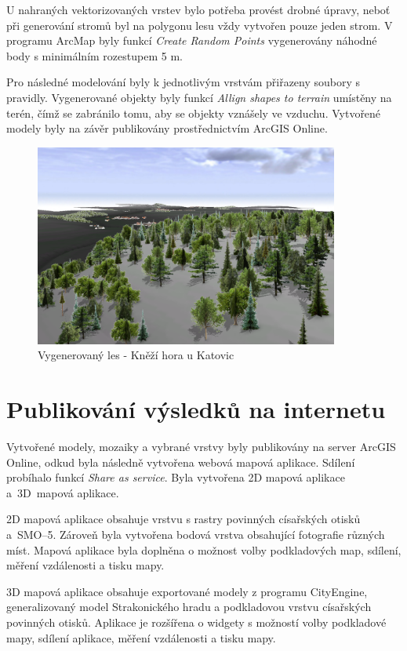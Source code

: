 \documentclass[thesis=M,czech]{FITthesis}[2012/06/26]
\begin{document}
U nahraných vektorizovaných vrstev bylo potřeba provést drobné úpravy, neboť při generování stromů byl na polygonu lesu vždy vytvořen pouze jeden strom. V programu ArcMap byly funkcí \textit{Create Random Points} vygenerovány náhodné body s minimálním rozestupem 5 m. 

Pro následné modelování byly k jednotlivým vrstvám přiřazeny soubory s pravidly. Vygenerované objekty byly funkcí \textit{Allign shapes to terrain} umístěny na terén, čímž se zabránilo tomu, aby se objekty vznášely ve vzduchu. Vytvořené modely byly na závěr publikovány prostřednictvím ArcGIS Online.

\begin{figure}[h]
	\centering
	\includegraphics[width=10cm]{pics/lesy_knezihora.png}
	\caption{Vygenerovaný les - Kněží hora u Katovic}
	\label{obrazek:knezihora}
\end{figure}


\section{Publikování výsledků na internetu}
Vytvořené modely, mozaiky a vybrané vrstvy byly publikovány na server Arc\-GIS Online, odkud byla následně vytvořena webová mapová aplikace. Sdílení probíhalo funkcí \textit{Share as service}. Byla vytvořena 2D mapová aplikace a~3D~mapová aplikace. 

2D mapová aplikace obsahuje vrstvu s rastry povinných císařských otisků a~SMO–5. Zároveň byla vytvořena bodová vrstva obsahující fotografie různých míst. Mapová aplikace byla doplněna o možnost volby podkladových map, sdílení, měření vzdálenosti a tisku mapy. 

3D mapová aplikace obsahuje exportované modely z programu CityEngine, generalizovaný model Strakonického hradu a podkladovou vrstvu císařských povinných otisků. Aplikace je rozšířena o widgety s možností volby podkladové mapy, sdílení aplikace, měření vzdálenosti a tisku mapy.
\end{document}
